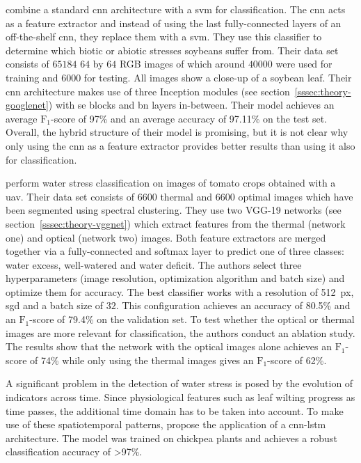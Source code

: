 \documentclass[draft,final]{vutinfth} %
\begin{document}
\textcite{venal2019} combine a standard \gls{cnn} architecture with a
\gls{svm} for classification. The \gls{cnn} acts as a feature
extractor and instead of using the last fully-connected layers of an
off-the-shelf \gls{cnn}, they replace them with a \gls{svm}. They use
this classifier to determine which biotic or abiotic stresses soybeans
suffer from. Their data set consists of $65184$ $64$ by $64$ RGB
images of which around $40000$ were used for training and $6000$ for
testing. All images show a close-up of a soybean leaf. Their \gls{cnn}
architecture makes use of three Inception modules (see
section~\ref{sssec:theory-googlenet}) with \gls{se} blocks and
\gls{bn} layers in-between. Their model achieves an average
$\mathrm{F}_1$-score of 97\% and an average accuracy of 97.11\% on the
test set. Overall, the hybrid structure of their model is promising,
but it is not clear why only using the \gls{cnn} as a feature
extractor provides better results than using it also for
classification.

\textcite{aversano2022} perform water stress classification on images
of tomato crops obtained with a \gls{uav}. Their data set consists of
$6600$ thermal and $6600$ optimal images which have been segmented
using spectral clustering. They use two VGG-19 networks (see
section~\ref{sssec:theory-vggnet}) which extract features from the
thermal (network one) and optical (network two) images. Both feature
extractors are merged together via a fully-connected and softmax layer
to predict one of three classes: water excess, well-watered and water
deficit. The authors select three hyperparameters (image resolution,
optimization algorithm and batch size) and optimize them for
accuracy. The best classifier works with a resolution of
\qty{512}{px}, \gls{sgd} and a batch size of $32$. This configuration
achieves an accuracy of 80.5\% and an $\mathrm{F}_1$-score of 79.4\%
on the validation set. To test whether the optical or thermal images
are more relevant for classification, the authors conduct an ablation
study. The results show that the network with the optical images alone
achieves an $\mathrm{F}_1$-score of 74\% while only using the thermal
images gives an $\mathrm{F}_1$-score of 62\%.

A significant problem in the detection of water stress is posed by the
evolution of indicators across time. Since physiological features such
as leaf wilting progress as time passes, the additional time domain
has to be taken into account. To make use of these spatiotemporal
patterns, \textcite{azimi2021} propose the application of a
\gls{cnn-lstm} architecture. The model was trained on chickpea plants
and achieves a robust classification accuracy of >97\%.
\end{document}
